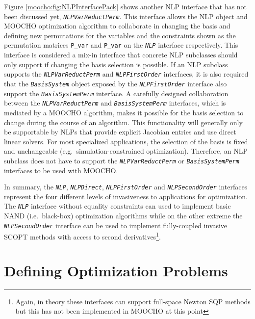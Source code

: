 \documentclass[pdf,12pt,report]{SANDreport}
\begin{document}
Figure {}\ref{moocho:fig:NLPInterfacePack} shows another NLP interface that
has not been discussed yet, {}\texttt{\textit{NLP\-Var\-Reduct\-Perm}}.  This
interface allows the NLP object and MOOCHO optimization algorithm to
collaborate in changing the basis and defining new permutations for the
variables and the constraints shown as the permutation matrices
{}\texttt{P\_var} and {}\texttt{P\_var} on the {}\texttt{\textit{NLP}}
interface respectively.  This interface is considered a mix-in interface that
concrete NLP subclasses should only support if changing the basis selection is
possible.  If an NLP subclass supports the
{}\texttt{\textit{NLP\-Var\-Reduct\-Perm}} and
{}\texttt{\textit{NLP\-First\-Order}} interfaces, it is also required that the
{}\texttt{\textit{Basis\-System}} object exposed by the
{}\texttt{\textit{NLP\-First\-Order}} interface also support the
{}\texttt{\textit{Basis\-System\-Perm}} interface.  A carefully designed
collaboration between the {}\texttt{\textit{NLP\-Var\-Reduct\-Perm}} and
{}\texttt{\textit{Basis\-System\-Perm}} interfaces, which is mediated by a
MOOCHO algorithm, makes it possible for the basis selection to change during
the course of an algorithm.  This functionality will generally only be
supportable by NLPs that provide explicit Jacobian entries and use direct
linear solvers.  For most specialized applications, the selection of the basis
is fixed and unchangeable (e.g.\ simulation-constrained optimization).
Therefore, an NLP subclass does not have to support the
{}\texttt{\textit{NLP\-Var\-Reduct\-Perm}} or
{}\texttt{\textit{Basis\-System\-Perm}} interfaces to be used with MOOCHO.

In summary, the {}\texttt{\textit{NLP}}, {}\texttt{\textit{NLP\-Direct}},
{}\texttt{\textit{NLP\-First\-Order}} and
{}\texttt{\textit{NLP\-Second\-Order}} interfaces represent the four different
levels of invasiveness to applications for optimization.  The
{}\texttt{\textit{NLP}} interface without equality constraints can used to
implement basic NAND (i.e.\ black-box) optimization algorithms while on the
other extreme the {}\texttt{\textit{NLP\-Second\-Order}} interface can be used
to implement fully-coupled invasive SCOPT methods with access to second
derivatives\footnote{Again, in theory these interfaces can support full-space
Newton SQP methods but this has not been implemented in MOOCHO at this point}.

%
\section{Defining Optimization Problems}
\label{moocho:sec:defining_opt_problems}
%
\end{document}
